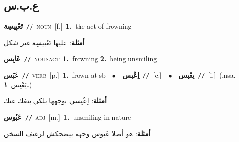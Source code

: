 \documentclass[10pt,a4paper,twoside]{article} %
\begin{document}
\begin{multicols}{2}
\vspace{-3mm}
\subsection*{\color{blue}\foreignlanguage{arabic}{ع.ب.س}\color{blue}{}} 

{\setlength\topsep{0pt}\textbf{\foreignlanguage{arabic}{تَعْبِيسِة}}\ {\color{gray}\texttt{//}\color{black}}\ \textsc{noun}\ [f.]\ \textbf{1.}~the act of frowning\  \begin{flushright}\color{gray}\foreignlanguage{arabic}{\textbf{\underline{\foreignlanguage{arabic}{أمثلة}}}: عليها تَعْبيسِة غير شكل}\end{flushright}\color{black}} \vspace{2mm}

{\setlength\topsep{0pt}\textbf{\foreignlanguage{arabic}{عَابِس}}\ {\color{gray}\texttt{//}\color{black}}\ \textsc{noun\textunderscore act}\ \textbf{1.}~frowning  \textbf{2.}~being unsmiling\ } \vspace{2mm}

{\setlength\topsep{0pt}\textbf{\foreignlanguage{arabic}{عَبَس}}\ {\color{gray}\texttt{//}\color{black}}\ \textsc{verb}\ [p.]\ \textbf{1.}~frown at sb\ \ $\bullet$\ \ \setlength\topsep{0pt}\textbf{\foreignlanguage{arabic}{اِعْبِس}}\ {\color{gray}\texttt{//}\color{black}}\ [c.]\ \ $\bullet$\ \ \setlength\topsep{0pt}\textbf{\foreignlanguage{arabic}{يِعْبِس}}\ {\color{gray}\texttt{//}\color{black}}\ [i.]\ \color{gray}(msa. \foreignlanguage{arabic}{يَعْبِس}~\foreignlanguage{arabic}{\textbf{١.}})\color{black}\  \begin{flushright}\color{gray}\foreignlanguage{arabic}{\textbf{\underline{\foreignlanguage{arabic}{أمثلة}}}: اِعْبِسي بوجهها بلكي بتفك عنك}\end{flushright}\color{black}} \vspace{2mm}

{\setlength\topsep{0pt}\textbf{\foreignlanguage{arabic}{عَبُوس}}\ {\color{gray}\texttt{//}\color{black}}\ \textsc{adj}\ [m.]\ \textbf{1.}~unsmiling in nature\  \begin{flushright}\color{gray}\foreignlanguage{arabic}{\textbf{\underline{\foreignlanguage{arabic}{أمثلة}}}: هو أصلا عَبوس وجهه بيضحكش لرغيف السخن}\end{flushright}\color{black}} \vspace{2mm}


\end{multicols}
\end{document}
